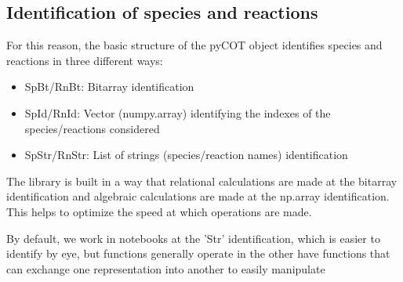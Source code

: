 \documentclass[12pt]{article}
\begin{document}
\subsection{Identification of species and reactions}
For this reason, the basic structure of the pyCOT object identifies species and reactions in three different ways:
\begin{itemize}
\item SpBt/RnBt: Bitarray identification
\item SpId/RnId: Vector (numpy.array) identifying the indexes of the species/reactions considered
\item SpStr/RnStr: List of strings (species/reaction names) identification 
\end{itemize}

The library is built in a way that relational calculations are made at the bitarray identification and algebraic calculations are made at the np.array identification. This helps to optimize the speed at which operations are made.

By default, we work in notebooks at the 'Str' identification, which is easier to identify by eye, but functions generally operate in the other  
have functions that can exchange one representation into another to easily manipulate
\end{document}
